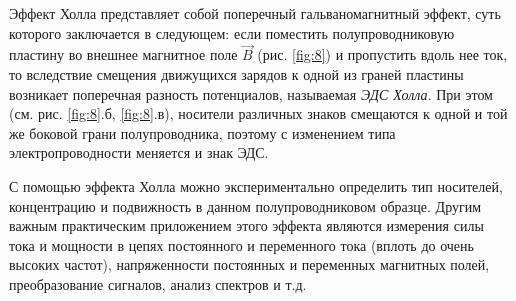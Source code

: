 Эффект Холла представляет собой поперечный гальваномагнитный эффект, суть которого заключается в следующем: если поместить полупроводниковую пластину во внешнее магнитное поле $\vec B$ (рис. \ref{fig:8}) и пропустить вдоль нее ток, то вследствие смещения движущихся зарядов к одной из граней пластины возникает поперечная разность потенциалов, называемая \textit{ЭДС Холла}. При этом (см. рис. \ref{fig:8}.б, \ref{fig:8}.в), носители различных знаков смещаются к одной и той же боковой грани полупроводника, поэтому с изменением типа электропроводности меняется и знак ЭДС.

С помощью эффекта Холла можно экспериментально определить тип носителей, концентрацию и подвижность в данном полупроводниковом образце. Другим важным практическим приложением этого эффекта являются измерения силы тока и мощности в цепях постоянного и переменного тока  (вплоть до очень высоких частот), напряженности постоянных и переменных магнитных полей, преобразование сигналов, анализ спектров и т.д.

